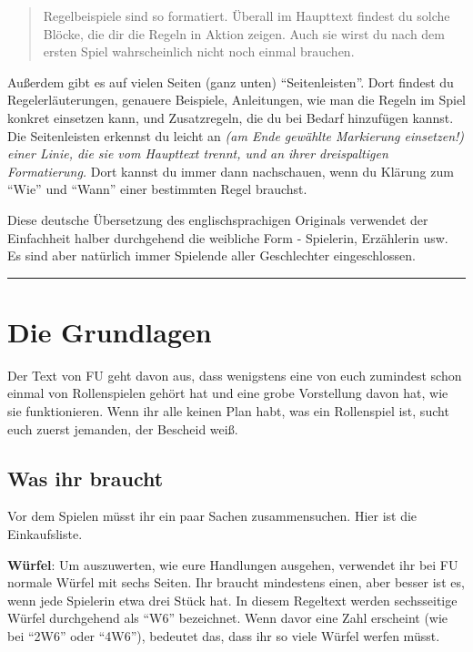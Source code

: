 \documentclass[]{article}
\begin{document}
\begin{quote}
Regelbeispiele sind so formatiert. Überall im Haupttext findest du
solche Blöcke, die dir die Regeln in Aktion zeigen. Auch sie wirst du
nach dem ersten Spiel wahrscheinlich nicht noch einmal brauchen.
\end{quote}

Außerdem gibt es auf vielen Seiten (ganz unten) ``Seitenleisten''. Dort
findest du Regelerläuterungen, genauere Beispiele, Anleitungen, wie man
die Regeln im Spiel konkret einsetzen kann, und Zusatzregeln, die du bei
Bedarf hinzufügen kannst. Die Seitenleisten erkennst du leicht an
\emph{(am Ende gewählte Markierung einsetzen!) einer Linie, die sie vom
Haupttext trennt, und an ihrer dreispaltigen Formatierung.} Dort kannst
du immer dann nachschauen, wenn du Klärung zum ``Wie'' und ``Wann''
einer bestimmten Regel brauchst.

Diese deutsche Übersetzung des englischsprachigen Originals verwendet
der Einfachheit halber durchgehend die weibliche Form - Spielerin,
Erzählerin usw. Es sind aber natürlich immer Spielende aller
Geschlechter eingeschlossen.

\begin{center}\rule{0.5\linewidth}{\linethickness}\end{center}

\section{Die Grundlagen}\label{die-grundlagen}

Der Text von FU geht davon aus, dass wenigstens eine von euch zumindest
schon einmal von Rollenspielen gehört hat und eine grobe Vorstellung
davon hat, wie sie funktionieren. Wenn ihr alle keinen Plan habt, was
ein Rollenspiel ist, sucht euch zuerst jemanden, der Bescheid weiß.

\subsection{Was ihr braucht}\label{was-ihr-braucht}

Vor dem Spielen müsst ihr ein paar Sachen zusammensuchen. Hier ist die
Einkaufsliste.

\textbf{Würfel}: Um auszuwerten, wie eure Handlungen ausgehen, verwendet
ihr bei FU normale Würfel mit sechs Seiten. Ihr braucht mindestens
einen, aber besser ist es, wenn jede Spielerin etwa drei Stück hat. In
diesem Regeltext werden sechsseitige Würfel durchgehend als ``W6''
bezeichnet. Wenn davor eine Zahl erscheint (wie bei ``2W6'' oder
``4W6''), bedeutet das, dass ihr so viele Würfel werfen müsst.
\end{document}
